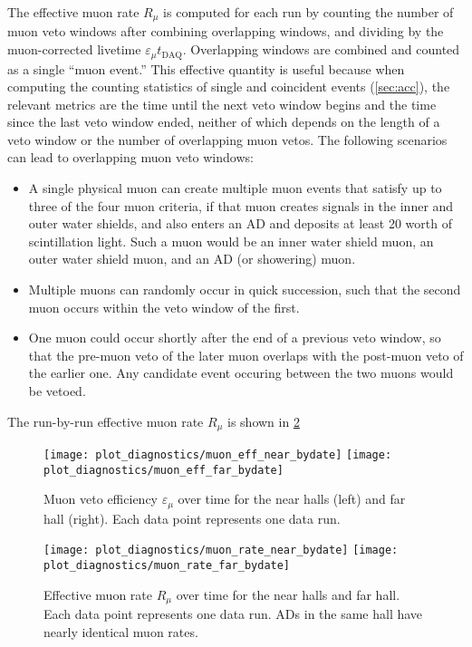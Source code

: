 The effective muon rate $R_\mu$ is computed for each run
by counting the number of muon veto windows
after combining overlapping windows, and dividing by the muon-corrected
livetime $\varepsilon_\mu t_{\text{DAQ}}$.
Overlapping windows are combined and counted as a single ``muon event.''
This effective quantity is useful
because when computing the counting statistics of single and coincident events
(\cref{sec:acc}),
the relevant metrics are the time until the next veto window begins
and the time since the last veto window ended,
neither of which depends on the length of a veto window
or the number of overlapping muon vetos.
The following scenarios can lead to overlapping muon veto windows:
\begin{itemize}
    \item A single physical muon can create multiple muon events
        that satisfy up to three of the four muon criteria,
        if that muon creates signals in the inner and outer water shields,
        and also enters an AD and deposits at least \SI{20}{\mev} worth of scintillation light.
        Such a muon would be an inner water shield muon,
        an outer water shield muon, and an AD
        (or showering) muon.
    \item Multiple muons can randomly occur in quick succession,
        such that the second muon occurs within the veto window of the first.
    \item One muon could occur shortly after the end of a previous veto window,
        so that the pre-muon veto of the later muon overlaps with the
        post-muon veto of the earlier one.
        Any candidate event occuring between the two muons would be vetoed.
\end{itemize}
The run-by-run effective muon rate $R_\mu$ is shown in \cref{fig:muon_rate}

\begin{figure}
    \texttt{[image: plot\_diagnostics/muon\_eff\_near\_bydate]}
    \texttt{[image: plot\_diagnostics/muon\_eff\_far\_bydate]}
    \caption{
        Muon veto efficiency $\varepsilon_\mu$ over time for
        the near halls (left) and far hall (right).
        Each data point represents one data run.
    }
    \label{fig:veto_eff}
\end{figure}

\begin{figure}
    \texttt{[image: plot\_diagnostics/muon\_rate\_near\_bydate]}
    \texttt{[image: plot\_diagnostics/muon\_rate\_far\_bydate]}
    \caption{
        Effective muon rate $R_\mu$ over time for the near halls and far hall.
        Each data point represents one data run.
        ADs in the same hall have nearly identical muon rates.
    }
    \label{fig:muon_rate}
\end{figure}

